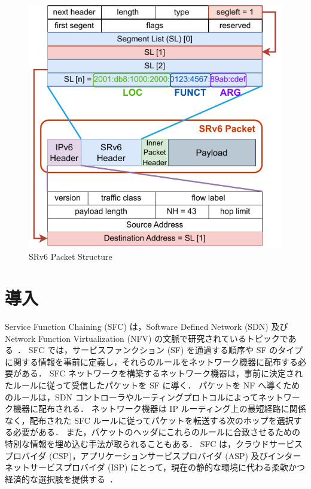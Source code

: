 \newpage
\begin{figure}[t]
    \centering
    \includegraphics[width=0.95\linewidth]{img/SRv6Packet.pdf}
    \caption{SRv6 Packet Structure}
    \label{fig:srv6-packet}
\end{figure}

\section{導入}
\label{section:background}
Service Function Chaining (SFC) は，Software Defined Network (SDN) 及び Network Function Virtualization (NFV) の文脈で研究されているトピックである~\cite{nfv,sfc-on-sdn-nfv-servey,sfc-on-sdn-scenario,imple-sfc-with-openflow}．
SFC では，サービスファンクション (SF) を通過する順序や SF のタイプに関する情報を事前に定義し，それらのルールをネットワーク機器に配布する必要がある．
SFC ネットワークを構築するネットワーク機器は，事前に決定されたルールに従って受信したパケットを SF に導く．
パケットを NF へ導くためのルールは，SDN コントローラやルーティングプロトコルによってネットワーク機器に配布される．
ネットワーク機器は IP ルーティング上の最短経路に関係なく，配布された SFC ルールに従ってパケットを転送する次のホップを選択する必要がある．
また，パケットのヘッダにこれらのルールに合致させるための特別な情報を埋め込む手法が取られることもある．
SFC は，クラウドサービスプロバイダ (CSP)，アプリケーションサービスプロバイダ (ASP) 及びインターネットサービスプロバイダ (ISP) にとって，現在の静的な環境に代わる柔軟かつ経済的な選択肢を提供する~\cite{survey-on-sfc}．

